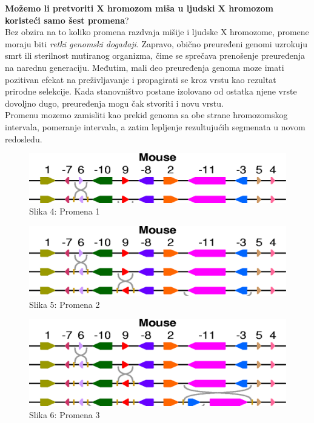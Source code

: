 \documentclass{article}
\begin{document}
\noindent \textbf{Možemo  li pretvoriti X hromozom miša u ljudski X hromozom koristeći samo šest promena}?\\

Bez obzira na to koliko promena razdvaja mišije i ljudske X hromozome, promene moraju biti \textit{retki genomski događaji}. Zapravo, obično preuređeni genomi uzrokuju smrt ili sterilnost mutiranog organizma, čime se sprečava prenošenje preuređenja na narednu generaciju. Međutim, mali deo preuređenja genoma moze imati pozitivan efekat na preživljavanje i propagirati se kroz vrstu kao rezultat prirodne selekcije. Kada stanovništvo postane izolovano od ostatka njene vrste dovoljno dugo, preuređenja mogu čak stvoriti i novu vrstu.\\

Promenu mozemo zamisliti kao prekid genoma sa obe strane hromozomskog intervala, pomeranje intervala, a zatim lepljenje rezultujućih segmenata u novom redosledu.\\

\begin{figure}[h!]
\centering
\includegraphics[scale=0.32]{slike/niz1.png}
\caption{Slika 4: Promena 1}
\label{slika:X}
\end{figure}

\begin{figure}[h!]
\centering
\includegraphics[scale=0.32]{slike/niz2.png}
\caption{Slika 5: Promena 2}
\label{slika:X}
\end{figure}

\begin{figure}[h!]
\centering
\includegraphics[scale=0.32]{slike/niz3.png}
\caption{Slika 6: Promena 3}
\label{slika:X}
\end{figure}
\end{document}
